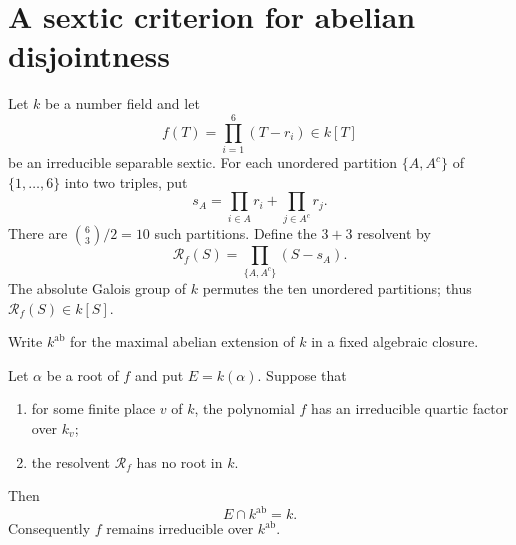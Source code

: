 \section{A sextic criterion for abelian disjointness}
\label{sec:sextic-abelian-criterion}

Let $k$ be a number field and let
\[
 f(T)=\prod_{i=1}^6(T-r_i)\in k[T]
\]
be an irreducible separable sextic.  For each unordered partition
$\{A,A^c\}$ of $\{1,\ldots,6\}$ into two triples, put
\[
 s_A=\prod_{i\in A}r_i+\prod_{j\in A^c}r_j.
\]
There are $\binom63/2=10$ such partitions.  Define the $3+3$ resolvent
by
\begin{equation}
 \mathcal R_f(S)=
 \prod_{\{A,A^c\}}(S-s_A).
 \label{eq:abstract-three-three-resolvent}
\end{equation}
The absolute Galois group of $k$ permutes the ten unordered partitions;
thus $\mathcal R_f(S)\in k[S]$.

Write $k^{\mathrm{ab}}$ for the maximal abelian extension of $k$ in a
fixed algebraic closure.

\begin{theorem}
\label{thm:sextic-abelian-disjointness}
Let $\alpha$ be a root of $f$ and put $E=k(\alpha)$.  Suppose that
\begin{enumerate}[label=\textup{(\roman*)}]
 \item for some finite place $v$ of $k$, the polynomial $f$ has an
       irreducible quartic factor over $k_v$;
 \item the resolvent $\mathcal R_f$ has no root in $k$.
\end{enumerate}
Then
\[
 E\cap k^{\mathrm{ab}}=k.
\]
Consequently $f$ remains irreducible over $k^{\mathrm{ab}}$.
\end{theorem}

